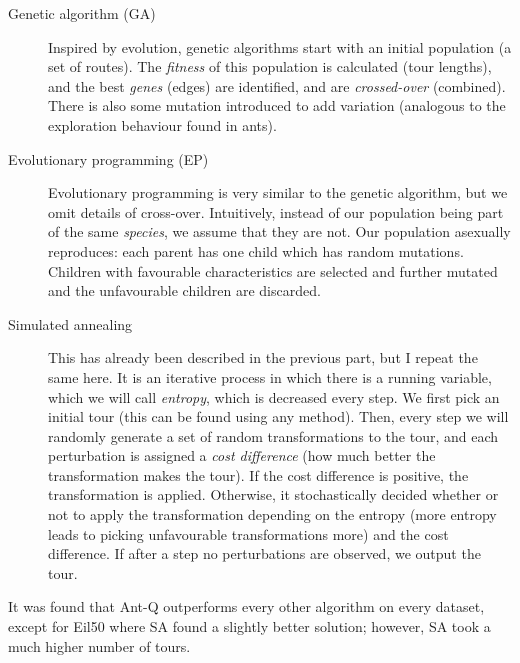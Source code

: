\begin{description}
    \item[Genetic algorithm (GA)] Inspired by evolution, genetic algorithms start with an initial population (a set of routes). The \emph{fitness} of this population is calculated (tour lengths), and the best \emph{genes} (edges) are identified, and are \emph{crossed-over} (combined). There is also some mutation introduced to add variation (analogous to the exploration behaviour found in ants).
    \item[Evolutionary programming (EP)] Evolutionary programming is very similar to the genetic algorithm, but we omit details of cross-over. Intuitively, instead of our population being part of the same \emph{species}, we assume that they are not. Our population asexually reproduces: each parent has one child which has random mutations. Children with favourable characteristics are selected and further mutated and the unfavourable children are discarded. 
    \item[Simulated annealing] This has already been described in the previous part, but I repeat the same here. It is an iterative process in which there is a running variable, which we will call \emph{entropy}, which is decreased every step. We first pick an initial tour (this can be found using any method). Then, every step we will randomly generate a set of random transformations to the tour, and each perturbation is assigned a \emph{cost difference} (how much better the transformation makes the tour). If the cost difference is positive, the transformation is applied. Otherwise, it stochastically decided whether or not to apply the transformation depending on the entropy (more entropy leads to picking unfavourable transformations more) and the cost difference. If after a step no perturbations are observed, we output the tour. 
\end{description}

It was found that Ant-Q outperforms every other algorithm on every dataset, except for Eil50 where SA found a slightly better solution; however, SA took a much higher number of tours. 